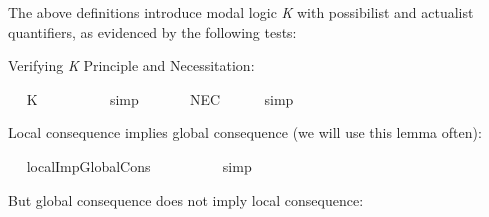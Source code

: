 \begin{isabellebody}
\isamarkuptrue%
%
\begin{isamarkuptext}%
The above definitions introduce modal logic \emph{K} with possibilist and actualist quantifiers,
as evidenced by the following tests:%
\end{isamarkuptext}\isamarkuptrue%
%
\begin{isamarkuptext}%
Verifying \emph{K} Principle and Necessitation:%
\end{isamarkuptext}\isamarkuptrue%
\ \isamarkupfalse%
\ K{\isacharcolon}\ {\isachardoublequoteopen}{\isasymlfloor}{\isacharparenleft}\isactrlbold {\isasymbox}{\isacharparenleft}{\isasymphi}\ \isactrlbold {\isasymrightarrow}\ {\isasympsi}{\isacharparenright}{\isacharparenright}\ \isactrlbold {\isasymrightarrow}\ {\isacharparenleft}\isactrlbold {\isasymbox}{\isasymphi}\ \isactrlbold {\isasymrightarrow}\ \isactrlbold {\isasymbox}{\isasympsi}{\isacharparenright}{\isasymrfloor}{\isachardoublequoteclose}%
\ %
%
\isamarkupfalse%
\ simp\ \ \ \ %
%
%
%
\isanewline
\ \isamarkupfalse%
\ NEC{\isacharcolon}\ {\isachardoublequoteopen}{\isasymlfloor}{\isasymphi}{\isasymrfloor}\ {\isasymLongrightarrow}\ {\isasymlfloor}\isactrlbold {\isasymbox}{\isasymphi}{\isasymrfloor}{\isachardoublequoteclose}%
\ %
%
\isamarkupfalse%
\ simp\ \ \ \ %
%
%
%
%
\begin{isamarkuptext}%
Local consequence implies global consequence (we will use this lemma often):%
\end{isamarkuptext}\isamarkuptrue%
\ \isamarkupfalse%
\ localImpGlobalCons{\isacharcolon}\ {\isachardoublequoteopen}{\isasymlfloor}{\isasymphi}\ \isactrlbold {\isasymrightarrow}\ {\isasymxi}{\isasymrfloor}\ {\isasymLongrightarrow}\ {\isasymlfloor}{\isasymphi}{\isasymrfloor}\ {\isasymlongrightarrow}\ {\isasymlfloor}{\isasymxi}{\isasymrfloor}{\isachardoublequoteclose}%
\ %
%
\isamarkupfalse%
\ simp%
%
%
%
\begin{isamarkuptext}%
But global consequence does not imply local consequence:%
\end{isamarkuptext}\isamarkuptrue%
\ \isamarkupfalse%
\ {\isachardoublequoteopen}{\isasymlfloor}{\isasymphi}{\isasymrfloor}\ {\isasymlongrightarrow}\ {\isasymlfloor}{\isasymxi}{\isasymrfloor}\ {\isasymLongrightarrow}\ {\isasymlfloor}{\isasymphi}\ \isactrlbold {\isasymrightarrow}\ {\isasymxi}{\isasymrfloor}{\isachardoublequoteclose}\ \isamarkupfalse%

\end{isabellebody}
